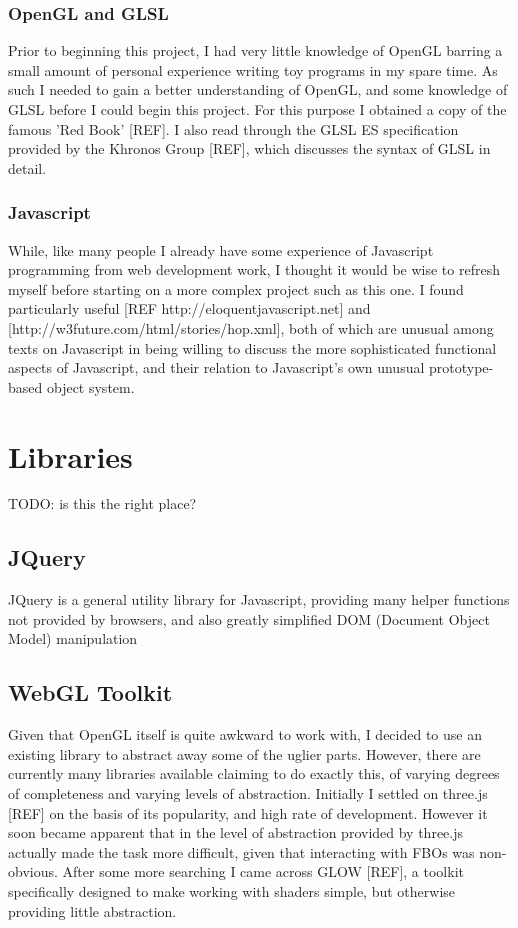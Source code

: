\documentclass[12pt,twoside,notitlepage]{report}
\begin{document}
\subsubsection{OpenGL and GLSL}
Prior to beginning this project, I had very little knowledge of OpenGL barring a small amount of personal experience writing toy programs in my spare time. As such I needed to gain a better understanding of OpenGL, and some knowledge of GLSL before I could begin this project. For this purpose I obtained a copy of the famous 'Red Book' [REF]. I also read through the GLSL ES specification provided by the Khronos Group [REF], which discusses the syntax of GLSL in detail.

\subsubsection{Javascript}
While, like many people I already have some experience of Javascript programming from web development work, I thought it would be wise to refresh myself before starting on a more complex project such as this one. I found particularly useful [REF http://eloquentjavascript.net] and [http://w3future.com/html/stories/hop.xml], both of which are unusual among texts on Javascript in being willing to discuss the more sophisticated functional aspects of Javascript, and their relation to Javascript's own unusual prototype-based object system.


\section{Libraries}
TODO: is this the right place?

\subsection{JQuery}
JQuery is a general utility library for Javascript, providing many helper functions not provided by browsers, and also greatly simplified DOM (Document Object Model) manipulation

\subsection{WebGL Toolkit}
Given that OpenGL itself is quite awkward to work with, I decided to use an existing library to abstract away some of the uglier parts. However, there are currently many libraries available claiming to do exactly this, of varying degrees of completeness and varying levels of abstraction. Initially I settled on three.js [REF] on the basis of its popularity, and high rate of development. However it soon became apparent that in the level of abstraction provided by three.js actually made the task more difficult, given that interacting with FBOs was non-obvious. After some more searching I came across GLOW [REF], a toolkit specifically designed to make working with shaders simple, but otherwise providing little abstraction.
\end{document}
